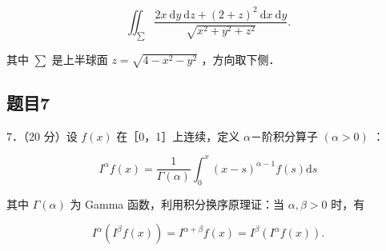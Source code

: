 \documentclass{article}
\begin{document}
\[
\iint_{\sum} \frac{2 x \mathrm{~d} y \mathrm{~d} z+(2+z)^{2} \mathrm{~d} x \mathrm{~d} y}{\sqrt{x^{2}+y^{2}+z^{2}}} .
\]

其中 \(\sum\) 是上半球面 \(z=\sqrt{4-x^{2}-y^{2}}\) ，方向取下侧．

\subsection{题目7}
7．（20 分）设 \(f(x)\) 在［0，1］上连续，定义 \(\alpha\)－阶积分算子 \((\alpha>0)\) ：

\[
I^{\alpha} f(x)=\frac{1}{\Gamma(\alpha)} \int_{0}^{x}(x-s)^{\alpha-1} f(s) \mathrm{d} s
\]

其中 \(\Gamma(\alpha)\) 为 Gamma 函数，利用积分换序原理证：当 \(\alpha, \beta>0\) 时，有

\[
I^{\alpha}\left(I^{\beta} f(x)\right)=I^{\alpha+\beta} f(x)=I^{\beta}\left(I^{\alpha} f(x)\right) .
\]
\end{document}
